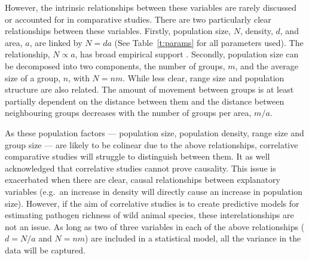 
However, the intrinsic relationships between these variables are rarely discussed or accounted for in comparative studies.
There are two particularly clear relationships between these variables.
Firstly, population size, $N$, density, $d$, and area, $a$, are linked by $N = da$ (See Table~\ref{t:params} for all parameters used).
The relationship, $N \propto a$, has broad empirical support \cite{blackburn2006variations, borregaard2010causality}.
Secondly, population size can be decomposed into two components, the number of groups, $m$, and the average size of a group, $n$, with $N = nm$.
While less clear, range size and population structure are also related.
The amount of movement between groups is at least partially dependent on the distance between them \cite{jenkins2010meta, le2012patterns, schooley2009enhancing} and the distance between neighbouring groups decreases with the number of groups per area, $m/a$.






As these population factors --- population size, population density, range size and group size --- are likely to be colinear due to the above relationships, correlative comparative studies will struggle to distinguish between them.
It as well acknowledged that correlative studies cannot prove causality.
This issue is exacerbated when there are clear, causal relationships between explanatory variables (e.g.\ an increase in density will directly cause an increase in population size).
However, if the aim of correlative studies is to create predictive models for estimating pathogen richness of wild animal species, these interelationships are not an issue.
As long as two of three variables in each of the above relationships ($d = N/a$ and $N = nm$) are included in a statistical model, all the variance in the data will be captured.

